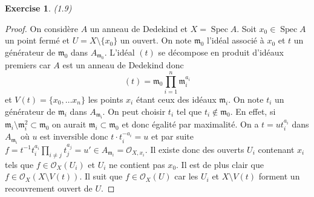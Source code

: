 \documentclass[A4, 11pt]{article}
\newtheorem{exer}{Exercise}
\def\Spec{ \operatorname{Spec}}
\begin{document}
 \begin{exer}(1.9)
 \end{exer}
 \begin{proof}
 On considère $A$ un anneau de Dedekind et $X=\Spec A$. Soit $x_0\in \Spec A$ un point fermé et $U=X\setminus \{x_0\}$ un ouvert. On note $\mathfrak{m}_0$ l'idéal associé à $x_0$ et $t$ un générateur de $\mathfrak{m_0}$ dans $A_{\mathfrak{m}_0}$. L'idéal $(t)$ se décompose en produit d'idéaux premiers car $A$ est un anneau de Dedekind donc 
 $$(t)= \mathfrak{m}_0 \prod\limits_{i=1}^{n} \mathfrak{m}_i^{a_i}$$
 et $V(t)=\{x_0,\dots x_n\}$ les points $x_i$ étant ceux des idéaux $\mathfrak{m}_i$.
 On note $t_i$ un générateur de $\mathfrak{m}_i$ dans $A_{\mathfrak{m_i}}$. On peut choisir $t_i$ tel que $t_i\notin \mathfrak{m}_0$. En effet, si $\mathfrak{m}_i\setminus \mathfrak{m}_i^2 \subset \mathfrak{m}_0$ on aurait $\mathfrak{m}_i\subset \mathfrak{m}_0$ et donc égalité par maximalité. On a $t=ut_i^{a_i}$ dans $A_{\mathfrak{m_i}}$ où $u$ est inversible donc $t\cdot t_i^{-a_i}=u$ et par suite $f=t^{-1}t_i^{a_i}\prod\limits_{i\neq j} t_j^{a_j} =u'\in A_{\mathfrak{m}_i}=\mathcal{O}_{X,x_i}$. Il existe donc des ouverts $U_i$ contenant $x_i$ tels que $f\in \mathcal{O}_X(U_i)$  et $U_i$ ne contient pas $x_0$. Il est de plus clair que $f\in \mathcal{O}_X(X\setminus V(t))$. Il suit que $f\in \mathcal{O}_X(U)$ car les $U_i$ et $X\setminus V(t)$ forment un recouvrement ouvert de $U$.
 \end{proof}
 
\end{document}
